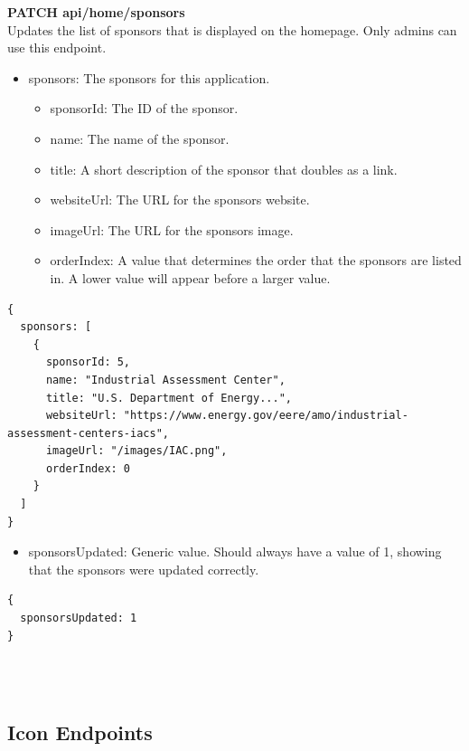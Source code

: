 \documentclass[onecolumn, draftclsnofoot,10pt, compsoc, usenames, dvipsnames]{IEEEtran}
\begin{document}
\noindent
\textbf{\textcolor{BlueGreen}{PATCH} api/home/sponsors} \\
Updates the list of sponsors that is displayed on the homepage. Only admins can use this endpoint.
\begin{itemize}
    \item sponsors: The sponsors for this application.
    \begin{itemize}
        \item sponsorId: The ID of the sponsor.
        \item name: The name of the sponsor.
        \item title: A short description of the sponsor that doubles as a link.
        \item websiteUrl: The URL for the sponsors website.
        \item imageUrl: The URL for the sponsors image.
        \item orderIndex: A value that determines the order that the sponsors are listed in. A lower value will appear before a larger value.
    \end{itemize}
\end{itemize}
\begin{lstlisting}[caption=Example Request Body]
{ 
  sponsors: [
    {
      sponsorId: 5,
      name: "Industrial Assessment Center",
      title: "U.S. Department of Energy...",
      websiteUrl: "https://www.energy.gov/eere/amo/industrial-assessment-centers-iacs",
      imageUrl: "/images/IAC.png",
      orderIndex: 0
    }
  ]
}
\end{lstlisting}
\begin{itemize}
    \item sponsorsUpdated: Generic value. Should always have a value of 1, showing that the sponsors were updated correctly.
\end{itemize}
\begin{lstlisting}[caption=Example Response]
{
  sponsorsUpdated: 1
}
\end{lstlisting}
\\~\\


\subsection{Icon Endpoints}
\end{document}
